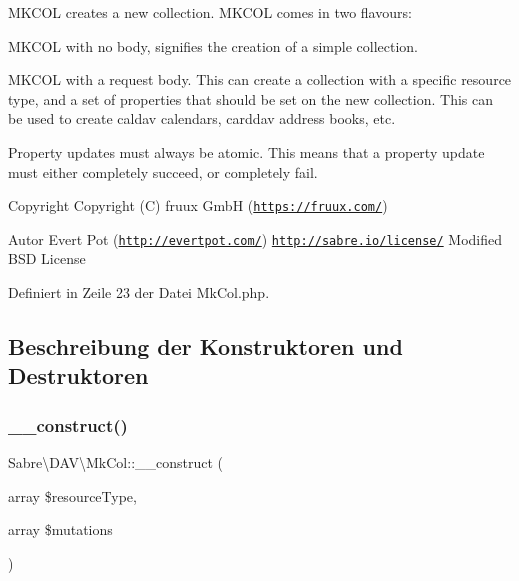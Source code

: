 M\+K\+C\+OL creates a new collection. M\+K\+C\+OL comes in two flavours\+:


\begin{DoxyEnumerate}
\item M\+K\+C\+OL with no body, signifies the creation of a simple collection.
\item M\+K\+C\+OL with a request body. This can create a collection with a specific resource type, and a set of properties that should be set on the new collection. This can be used to create caldav calendars, carddav address books, etc.
\end{DoxyEnumerate}

Property updates must always be atomic. This means that a property update must either completely succeed, or completely fail.

\begin{DoxyCopyright}{Copyright}
Copyright (C) fruux GmbH (\href{https://fruux.com/}{\tt https\+://fruux.\+com/}) 
\end{DoxyCopyright}
\begin{DoxyAuthor}{Autor}
Evert Pot (\href{http://evertpot.com/}{\tt http\+://evertpot.\+com/})  \href{http://sabre.io/license/}{\tt http\+://sabre.\+io/license/} Modified B\+SD License 
\end{DoxyAuthor}


Definiert in Zeile 23 der Datei Mk\+Col.\+php.



\subsection{Beschreibung der Konstruktoren und Destruktoren}
\mbox{\label{class_sabre_1_1_d_a_v_1_1_mk_col_ad55d7f010ebe4b4aa4f53f946e1a4285}} 
\subsubsection{\texorpdfstring{\+\_\+\+\_\+construct()}{\_\_construct()}}
{\footnotesize\ttfamily Sabre\textbackslash{}\+D\+A\+V\textbackslash{}\+Mk\+Col\+::\+\_\+\+\_\+construct (\begin{DoxyParamCaption}\item[{array}]{\$resource\+Type,  }\item[{array}]{\$mutations }\end{DoxyParamCaption})}


